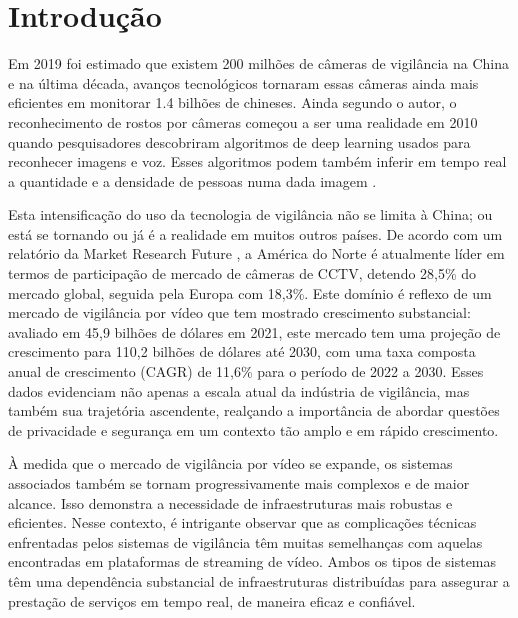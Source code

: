 \documentclass[12pt, %
openright, 
oneside, %
a4paper,    %
brazil]{facom-ufu-abntex2}
\begin{document}
\textual


\chapter[Introdução]{Introdução}
Em 2019 foi estimado que existem 200 milhões de câmeras de vigilância na China
e na última década, avanços tecnológicos tornaram essas câmeras ainda mais
eficientes em monitorar 1.4 bilhões de chineses. Ainda segundo o autor, o
reconhecimento de rostos por câmeras começou a ser uma realidade em 2010 quando
pesquisadores descobriram algoritmos de deep learning usados para reconhecer
imagens e voz. Esses algoritmos podem também inferir em tempo real a quantidade
e a densidade de pessoas numa dada imagem \cite{qiang2019road}.

Esta intensificação do uso da tecnologia de vigilância não se limita à China;
ou está se tornando ou já é a realidade em muitos outros países. De acordo com
um relatório da Market Research Future \cite{Gupta2018}, a América do Norte é
atualmente líder em termos de participação de mercado de câmeras de CCTV,
detendo 28,5\% do mercado global, seguida pela Europa com 18,3\%. Este domínio
é reflexo de um mercado de vigilância por vídeo que tem mostrado crescimento
substancial: avaliado em 45,9 bilhões de dólares em 2021, este mercado tem uma
projeção de crescimento para 110,2 bilhões de dólares até 2030, com uma taxa
composta anual de crescimento (CAGR) de 11,6\% para o período de 2022 a 2030.
Esses dados evidenciam não apenas a escala atual da indústria de vigilância,
mas também sua trajetória ascendente, realçando a importância de abordar
questões de privacidade e segurança em um contexto tão amplo e em rápido
crescimento.

À medida que o mercado de vigilância por vídeo se expande,
os sistemas associados também se tornam progressivamente mais complexos e de maior alcance.
Isso demonstra a necessidade de infraestruturas mais robustas e eficientes.
Nesse contexto, é intrigante observar que as complicações técnicas enfrentadas pelos
sistemas de vigilância têm muitas semelhanças com aquelas encontradas em plataformas de
streaming de vídeo. Ambos os tipos de
sistemas têm uma dependência substancial de infraestruturas distribuídas para
assegurar a prestação de serviços em tempo real, de maneira eficaz e confiável.
\end{document}
